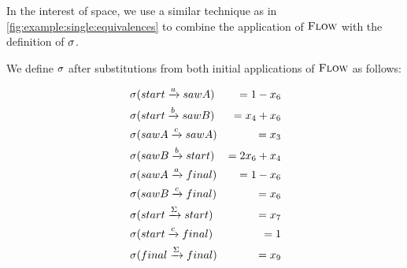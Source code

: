 \documentclass[acmsmall,review,anonymous,screen]{acmart}\settopmatter{printfolios=true,printccs=false,printacmref=true}
\theoremstyle{definition}
\begin{document}
In the interest of space, we use a similar technique as in
\cref{fig:example:single:equivalences} to combine the application of $\textsc{Flow}$
with the definition of $\operatorname{\sigma}$.

  We define $\operatorname{\sigma}$ after substitutions from both initial applications of
  $\textsc{Flow}$ as follows:

    \begin{equation*}
      \begin{aligned}
        & \operatorname{\sigma}(start \xrightarrow{a} sawA) & = 1 - x_6 \\
        & \operatorname{\sigma}(start \xrightarrow{b} sawB) & = x_4 + x_6 \\
        & \operatorname{\sigma}(sawA \xrightarrow{c} sawA)  & = x_3  \\
        & \operatorname{\sigma}(sawB \xrightarrow{b} start) & = 2x_6 + x_4 \\
        & \operatorname{\sigma}(sawA \xrightarrow{a} final) & = 1 - x_6 \\
        & \operatorname{\sigma}(sawB \xrightarrow{c} final) & = x_6 \\
        & \operatorname{\sigma}(start \xrightarrow{\Sigma} start) & = x_7 \\
        & \operatorname{\sigma}(start \xrightarrow{c} final) & = 1 \\
        & \operatorname{\sigma}(final \xrightarrow{\Sigma} final) & = x_9 \\
      \end{aligned}
    \end{equation*}
    
\end{document}
